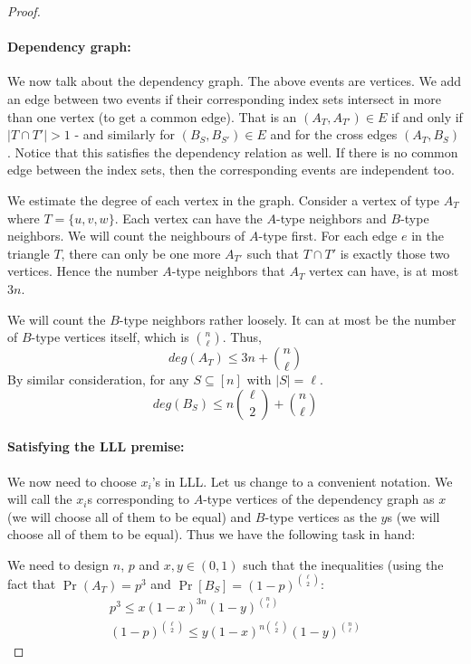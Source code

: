 \begin{proof}
\paragraph{Dependency graph:} We now talk about the dependency graph. The above events are vertices. We add an edge between two events if their corresponding index sets intersect in more than one vertex (to get a common edge). That is an $(A_T,A_{T'}) \in E$ if and only if $|T \cap T'| > 1$ - and similarly for $(B_S,B_{S'}) \in E$ and for the cross edges $(A_T,B_S)$. Notice that this satisfies the dependency relation as well. If there is no common edge between the index sets, then the corresponding events are independent too.

We estimate the degree of each vertex in the graph. Consider a vertex of type $A_T$ where $T=\{u,v,w\}$. Each vertex can have the $A$-type neighbors and $B$-type neighbors. We will count the neighbours of $A$-type first. For each edge $e$ in the triangle $T$, there can only be one more $A_{T'}$ such that $T \cap T'$ is exactly those two vertices. Hence the number $A$-type neighbors that $A_{T}$ vertex can have, is at most $3n$.

We will count the $B$-type neighbors rather loosely. It can at most be the number of $B$-type vertices itself, which is ${n \choose \ell}$. Thus,
$$deg(A_T) \le 3n+{n \choose \ell}$$
By similar consideration, for any $S \subseteq [n]$ with $|S|=\ell$.
$$deg(B_S) \le n{\ell \choose 2}+{n \choose \ell}$$

\paragraph{Satisfying the LLL premise:} 
We now need to choose $x_i$'s in LLL. Let us change to a convenient notation. We will call the $x_i$s corresponding to $A$-type vertices of the dependency graph as $x$ (we will choose all of them to be equal) and $B$-type vertices as the $y$s (we will choose all of them to be equal). Thus we have the following task in hand:

 We need to design $n$, $p$ and $x,y \in (0,1)$ such that the inequalities (using the fact that $\Pr(A_T)=p^3$ and $\Pr[B_S] = (1-p)^{\ell \choose 2}$:
\begin{eqnarray}
p^3 \le x(1-x)^{3n}(1-y)^{n \choose \ell}\\
\label{eqn:LLL1}
(1-p)^{\ell \choose 2} \le y(1-x)^{n{\ell \choose 2}}(1-y)^{n \choose \ell}
\label{eqn:LLL2}
\end{eqnarray}


\end{proof}
